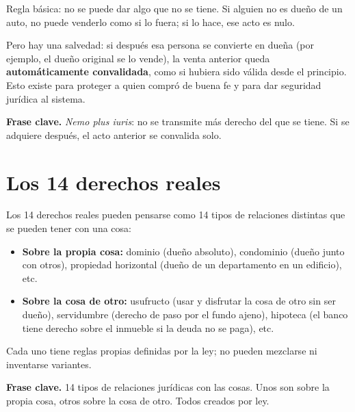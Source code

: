 \documentclass[12pt,oneside]{book}
\begin{document}
Regla b\'asica: no se puede dar algo que no se tiene. Si alguien no es due\~no de un auto, no puede venderlo como si lo fuera; si lo hace, ese acto es nulo.

Pero hay una salvedad: si despu\'es esa persona se convierte en due\~na (por ejemplo, el due\~no original se lo vende), la venta anterior queda \textbf{autom\'aticamente convalidada}, como si hubiera sido v\'alida desde el principio. Esto existe para proteger a quien compr\'o de buena fe y para dar seguridad jur\'idica al sistema.

\begin{note}
\textbf{Frase clave.} \textit{Nemo plus iuris}: no se transmite m\'as derecho del que se tiene. Si se adquiere despu\'es, el acto anterior se convalida solo.
\end{note}

\section{Los 14 derechos reales}

Los 14 derechos reales pueden pensarse como 14 tipos de relaciones distintas que se pueden tener con una cosa:

\begin{itemize}
    \item \textbf{Sobre la propia cosa:} dominio (due\~no absoluto), condominio (due\~no junto con otros), propiedad horizontal (due\~no de un departamento en un edificio), etc.
    \item \textbf{Sobre la cosa de otro:} usufructo (usar y disfrutar la cosa de otro sin ser due\~no), servidumbre (derecho de paso por el fundo ajeno), hipoteca (el banco tiene derecho sobre el inmueble si la deuda no se paga), etc.
\end{itemize}

Cada uno tiene reglas propias definidas por la ley; no pueden mezclarse ni inventarse variantes.

\begin{note}
\textbf{Frase clave.} 14 tipos de relaciones jur\'idicas con las cosas. Unos son sobre la propia cosa, otros sobre la cosa de otro. Todos creados por ley.
\end{note}
\end{document}
